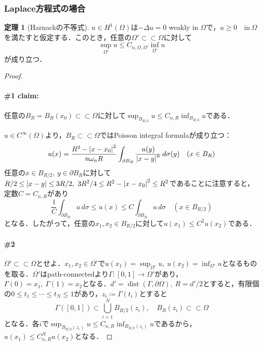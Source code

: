 \documentclass[a4paper]{ltjsarticle}
\newcommand{\Om}{\Omega}
\newcommand{\pOm}{\partial\Omega}
\newcommand{\ssubset}{\subset\subset}
\newcommand{\inn}{\quad\text{in}\ }
\newcommand{\1}{\mathbbm{1}}
\DeclareMathOperator{\dist}{\mathrm{dist}}
\numberwithin{equation}{section}
\theoremstyle{definition}
\newtheorem{thm}{定理}[section]
\begin{document}
\subsubsection{Laplace方程式の場合}
\begin{thm}[Harnackの不等式]\label{thm:harnack_laplace}
    $u\in H^1(\Om)$は$-\Delta u=0$ weakly in $\Om$で，$u\geq0\inn\Om$を満たすと仮定する．このとき，任意の$\Om'\ssubset \Om$に対して 
    \begin{equation}
        \sup_{\Om'}u\leq C_{n,\Om,\Om'}\inf_{\Om'}u
    \end{equation}
    が成り立つ．
\end{thm}
\begin{proof}
    \paragraph{\#1 claim:}任意の$B_R=B_R(x_0)\ssubset \Om$に対して$\sup_{B_{R/2}}u\leq C_{n,R}\inf_{B_{R/2}}u$である．

    $u\in C^\infty(\Om)$より，$B_R\ssubset \Om$ではPoisson integral formulaが成り立つ：
    \begin{equation}
        u(x)=\frac{R^2-\abs{x-x_0}^2}{n\omega_nR}\int_{\partial B_R}\frac{u(y)}{\abs{x-y}^n}\,d\sigma(y)\quad (x\in B_R) 
    \end{equation}
    任意の$x\in B_{R/2},\ y\in\partial B_R$に対して$R/2\leq \abs{x-y}\leq 3R/2,\ 3R^2/4\leq R^2-\abs{x-x_0}^2\leq R^2$であることに注意すると，定数$C=C_{n,R}$があり
    \begin{equation}
        \frac{1}{C}\int_{\partial B_R}u\,d\sigma\leq u(x)\leq C\int_{\partial B_R}u\,d\sigma \quad (x\in B_{R/2})
    \end{equation}
    となる．したがって，任意の$x_1,x_2\in B_{R/2}$に対して$u(x_1)\leq C^2u(x_2)$である．

    \paragraph{\#2}$\Om'\ssubset \Om$とせよ．$x_1,x_2\in \overline{\Om'}$で$u(x_1)=\sup_{\Om'}u,\ u(x_2)=\inf_{\Om'}u$となるものを取る．$\overline{\Om'}$はpath-connectedより$\Gamma\colon [0,1]\to \overline{\Om'}$があり，$\Gamma(0)=x_1,\ \Gamma(1)=x_2$となる．$d'=\dist(\Gamma,\pOm),\ R=d'/2$とすると，有限個の$0\leq t_1\leq \cdots\leq t_N\leq 1$があり，$z_i\coloneqq \Gamma(t_i)$とすると
    \begin{equation}
        \Gamma([0,1])\subset \bigcup_{i=1}^N B_{R/2}(z_i),\quad B_R(z_i)\ssubset \Om 
    \end{equation}
    となる．各$i$で$\sup_{B_{R/2}(z_i)}u\leq C_{n,R}\inf_{B_{R/2}(z_i)}u$であるから，$u(x_1)\leq C_{n,R}^N u(x_2)$となる．
\end{proof}
\end{document}
